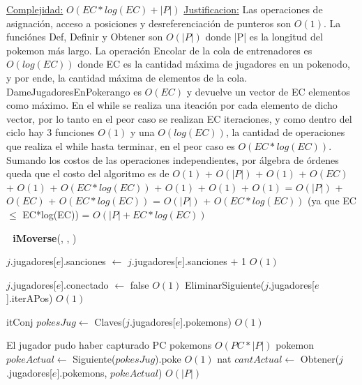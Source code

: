 \begin{Algoritmos}
\begin{algorithm}[H]
\begin{algorithmic}[1]
\medskip
\State \underline{Complejidad:} $O(EC*log(EC) + |P|)$ 
\State \underline{Justificacion:} Las operaciones de asignaci\'on, acceso a posiciones y desreferenciaci\'on de punteros son $O(1)$. La funci\'ones Def, Definir y Obtener son $O(|P|)$ donde |P| es la longitud del pokemon m\'as largo. La operaci\'on Encolar de la cola de entrenadores es $O(log(EC))$ donde EC es la cantidad m\'axima de jugadores en un pokenodo, y por ende, la cantidad m\'axima de elementos de la cola. DameJugadoresEnPokerango es $O(EC)$ y devuelve un vector de EC elementos como m\'aximo. En el while se realiza una iteaci\'on por cada elemento de dicho vector, por lo tanto en el peor caso se realizan EC iteraciones, y como dentro del ciclo hay 3 funciones $O(1)$ y una $O(log(EC))$, la cantidad de operaciones que realiza el while hasta terminar, en el peor caso es $O(EC*log(EC))$. Sumando los costos de las operaciones independientes, por \'algebra de \'ordenes queda que el costo del algoritmo es de $O(1)$ + $O(|P|)$ + $O(1)$ + $O(EC)$ + $O(1)$ + $O(EC*log(EC))$ + $O(1)$ + $O(1)$ + $O(1)$ = $O(|P|)$ + $O(EC)$ + $O(EC*log(EC))$ = $O(|P|)$ + $O(EC*log(EC))$ (ya que EC $\leq$ EC*log(EC)) = $O(|P| + EC*log(EC))$

\end{algorithmic}
\end{algorithm}


$ $\newline
$ $\newline
{\textbf{iMoverse}(, , )}
\begin{algorithmic}[1]

  
  \State $j$.jugadores[$e$].sanciones $\gets$ $j$.jugadores[$e$].sanciones $+$ 1 \Comment $O(1)$
  
  
    \State $j$.jugadores[$e$].conectado $\gets$ false \Comment $O(1)$
    \State EliminarSiguiente($j$.jugadores[$e$].iterAPos) \Comment $O(1)$
  
    \State itConj $pokesJug \gets$ Claves($j$.jugadores[$e$].pokemons) \Comment $O(1)$  
    
       \Comment El jugador pudo haber capturado PC pokemons $O(PC*|P|)$
      \State pokemon $pokeActual \gets$ Siguiente($pokesJug$).poke  \Comment $O(1)$
      \State nat $cantActual \gets$ Obtener($j$.jugadores[$e$].pokemons, $pokeActual$) \Comment $O(|P|)$
      

\end{algorithmic}
\end{Algoritmos}
